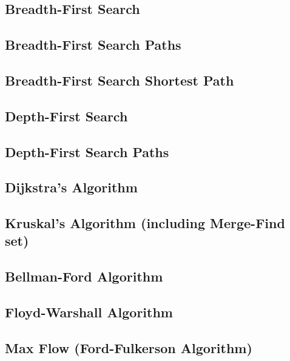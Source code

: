 \subsection{Breadth-First Search}
\raggedbottom
\hrulefill
\subsection{Breadth-First Search Paths}
\raggedbottom
\hrulefill
\subsection{Breadth-First Search Shortest Path}
\raggedbottom
\hrulefill
\subsection{Depth-First Search}
\raggedbottom
\hrulefill
\subsection{Depth-First Search Paths}
\raggedbottom
\hrulefill
\subsection{Dijkstra's Algorithm}
\raggedbottom
\hrulefill
\subsection{Kruskal's Algorithm (including Merge-Find set)}
\raggedbottom
\hrulefill
\subsection{Bellman-Ford Algorithm}
\raggedbottom
\hrulefill
\subsection{Floyd-Warshall Algorithm}
\raggedbottom
\hrulefill
\subsection{Max Flow (Ford-Fulkerson Algorithm)}
\raggedbottom
\hrulefill

